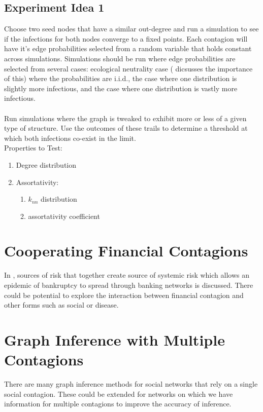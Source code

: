 \documentclass[11pt]{article}
\begin{document}
\subsection{Experiment Idea 1}
    Choose two seed nodes that have a similar out-degree and run a simulation to see if the infections for both nodes
    converge to a fixed points. Each contagion will have it's edge probabilities selected from a random variable that holds constant across simulations. Simulations should be run where edge probabilities are selected from several cases: ecological neutrality case (\cite{LIPSITCH20092} dicsusses the importance of this) where the probabilities are i.i.d., the case where one distribution is slightly more infectious, and the case where one distribution is vastly more infectious.
    \\ \\
    Run simulations where the graph is tweaked  to exhibit more or less of a given type of structure. Use the outcomes of these trails to determine a threshold at which both infections co-exist in the limit. \\
    Properties to Test:
    \begin{enumerate}
        \item Degree distribution
        \item Assortativity:
        \begin{enumerate}
            \item $k_{nn}$ distribution
            \item assortativity coefficient
        \end{enumerate}
    \end{enumerate}


\section{Cooperating Financial Contagions}
In \cite{CACCIOLI201550}, sources of risk that together create source of systemic risk which allows an epidemic of bankruptcy to spread through banking networks is discussed. There could be potential to explore the interaction between financial contagion and other forms such as social or disease.

\section{Graph Inference with Multiple Contagions}
There are many graph inference methods for social networks that rely on a single social contagion. These could be extended for networks on which we have information for multiple contagions to improve the accuracy of inference.






\end{document}
